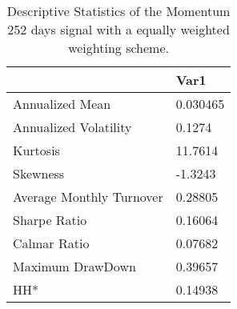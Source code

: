 \begin{table}[H]
\centering
\begin{tabular}{ll}
& Var1 \\ 
\hline 
Annualized Mean & 0.030465 \\ 
Annualized Volatility & 0.1274 \\ 
Kurtosis & 11.7614 \\ 
Skewness & -1.3243 \\ 
Average Monthly Turnover & 0.28805 \\ 
Sharpe Ratio & 0.16064 \\ 
Calmar Ratio & 0.07682 \\ 
Maximum DrawDown & 0.39657 \\ 
HH* & 0.14938 \\ 
\hline
\end{tabular}
\caption{Descriptive Statistics of the Momentum 252 days signal with a equally weighted weighting scheme.}
\label{MOM252EW}
\end{table}